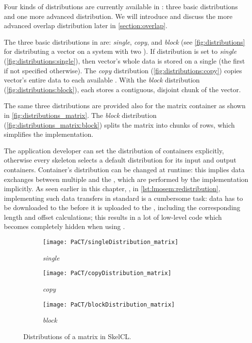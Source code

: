 Four kinds of distributions are currently available in \SkelCL:
three basic distributions and one more advanced distribution.
We will introduce and discuss the more advanced overlap distribution later in \autoref{section:overlap}.

The three basic distributions in \SkelCL are:
\emph{single}, \emph{copy}, and \emph{block} (see \autoref{fig:distributions} for distributing a vector on a system with two \GPUs).
If distribution is set to \emph{single} (\autoref{fig:distributions:single}), then vector's whole data is stored on a single \GPU (the first \GPU if not specified otherwise).
The \emph{copy} distribution (\autoref{fig:distributions:copy}) copies vector's entire data to each available \GPU.
With the \emph{block} distribution (\autoref{fig:distributions:block}), each \GPU stores a contiguous, disjoint chunk of the vector.

The same three distributions are provided also for the matrix container as shown in \autoref{fig:distributions_matrix}.
The \emph{block} distribution (\autoref{fig:distributions_matrix:block}) splits the matrix into chunks of rows, which simplifies the implementation.

The application developer can set the distribution of containers explicitly, otherwise every skeleton selects a default distribution for its input and output containers.
Container's distribution can be changed at runtime:
this implies data exchanges between multiple \GPUs and the \CPU, which are performed by the \SkelCL implementation implicitly.
As seen earlier in this chapter, \eg, in \autoref{lst:lmosem:redistribution}, implementing such data transfers in standard \OpenCL is a cumbersome task:
data has to be downloaded to the \CPU before it is uploaded to the \GPUs, including the corresponding length and offset calculations;
this results in a lot of low-level code which becomes completely hidden when using \SkelCL.

\begin{figure}[tbp]
  \centering
  \begin{subfigure}{.22\textwidth}
    \texttt{[image: PaCT/singleDistribution\_matrix]}
    \caption{\emph{single}}
    \label{fig:distributions_matrix:single}
  \end{subfigure}
  \hfill
  \begin{subfigure}{.22\textwidth}
    \texttt{[image: PaCT/copyDistribution\_matrix]}
    \caption{\emph{copy}}
    \label{fig:distributions_matrix:copy}
  \end{subfigure}
  \hfill
  \begin{subfigure}{.22\textwidth}
    \texttt{[image: PaCT/blockDistribution\_matrix]}
    \caption{\emph{block}}
    \label{fig:distributions_matrix:block}
  \end{subfigure}
  \caption{Distributions of a matrix in SkelCL.}
  \label{fig:distributions_matrix}
\end{figure}

